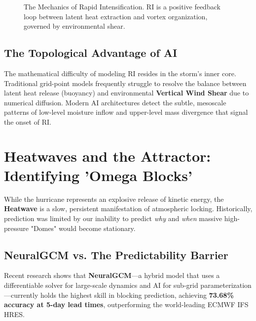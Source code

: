 \begin{figure}[H]
\centering
{}
\caption{The Mechanics of Rapid Intensification. RI is a positive feedback loop between latent heat extraction and vortex organization, governed by environmental shear.}
\label{fig:ri_tikz}
\end{figure}

\subsection{The Topological Advantage of AI}
The mathematical difficulty of modeling RI resides in the storm's inner core. Traditional grid-point models frequently struggle to resolve the balance between latent heat release (buoyancy) and environmental \textbf{Vertical Wind Shear} due to numerical diffusion. Modern AI architectures detect the subtle, mesoscale patterns of low-level moisture inflow and upper-level mass divergence that signal the onset of RI.

\section{Heatwaves and the Attractor: Identifying 'Omega Blocks'}

While the hurricane represents an explosive release of kinetic energy, the \textbf{Heatwave} is a slow, persistent manifestation of atmospheric locking. Historically, prediction was limited by our inability to predict \textit{why} and \textit{when} massive high-pressure "Domes" would become stationary. 

\subsection{NeuralGCM vs. The Predictability Barrier}
Recent research shows that \textbf{NeuralGCM}—a hybrid model that uses a differentiable solver for large-scale dynamics and AI for sub-grid parameterization—currently holds the highest skill in blocking prediction, achieving \textbf{73.68\% accuracy at 5-day lead times}, outperforming the world-leading ECMWF IFS HRES. 

